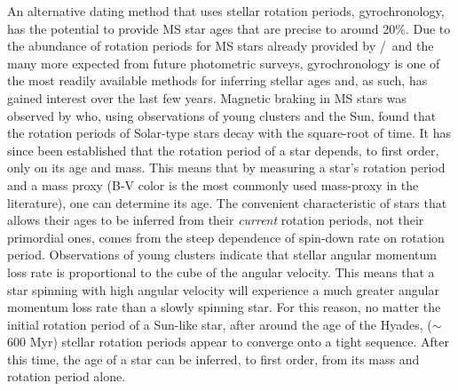 An alternative dating method that uses stellar rotation periods,
gyrochronology, has the potential to provide MS star ages that are precise to
around 20\%.
Due to the abundance of rotation periods for MS stars already provided by
\kepler/\ktwo\ and the many more expected from future photometric surveys,
gyrochronology is one of the most readily available methods for inferring
stellar ages and, as such, has gained interest over the last few years.
Magnetic braking in MS stars was observed by \citet{Skumanich1972} who, using
observations of young clusters and the Sun, found that the rotation periods of
Solar-type stars decay with the square-root of time.
It has since been established that the rotation period of a star depends, to
first order, only on its age and mass.
This means that by measuring a star's rotation period and a mass proxy (B-V
color is the most commonly used mass-proxy in the literature), one can
determine its age.
The convenient characteristic of stars that allows their ages to be inferred
from their {\it current} rotation periods, not their primordial ones, comes
from the steep dependence of spin-down rate on rotation period.
Observations of young clusters indicate that stellar angular momentum loss
rate is proportional to the cube of the angular velocity.
This means that a star spinning with high angular velocity will experience a
much greater angular momentum loss rate than a slowly spinning star.
For this reason, no matter the initial rotation period of a Sun-like star,
after around the age of the Hyades, ($\sim$ 600 Myr) stellar rotation periods
appear to converge onto a tight sequence.
After this time, the age of a star can be inferred, to first order, from its
mass and rotation period alone.

